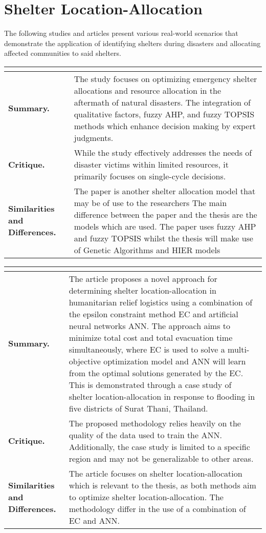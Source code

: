 \section{Shelter Location-Allocation}

The following studies and articles present various real-world scenarios that demonstrate the application of identifying shelters during disasters and allocating affected communities to said shelters.

\begin{longtable}{|L{.2\linewidth}|L{.74\linewidth}|}
	\hline
	\\ \hline
	\textbf{Summary.} & The study focuses on optimizing emergency shelter allocations and resource allocation in the aftermath of natural disasters. The integration of qualitative factors, fuzzy AHP, and fuzzy TOPSIS methods which enhance decision making by expert judgments.\\ \hline
	\textbf{Critique.} & While the study effectively addresses the needs of disaster victims within limited resources, it primarily focuses on single-cycle decisions.\\ \hline
	\textbf{Similarities and Differences.} & The paper is another shelter allocation model that may be of use to the researchers	The main difference between the paper and the thesis are the models which are used. The paper uses fuzzy AHP and fuzzy TOPSIS whilst the thesis will make use of Genetic Algorithms and HIER models \\ \hline
\end{longtable}

\begin{longtable}{|L{.2\linewidth}|L{.74\linewidth}|}
	\hline
	\\ \hline
	\textbf{Summary.} & The article proposes a novel approach for determining shelter location-allocation in humanitarian relief logistics using a combination of the epsilon constraint method EC and artificial neural networks ANN. The approach aims to minimize total cost and total evacuation time simultaneously, where EC is used  to solve a multi-objective optimization model and ANN will learn from the optimal solutions generated by the EC. This is demonstrated through a case study of shelter location-allocation in response to flooding in five districts of Surat Thani, Thailand.\\ \hline
	\textbf{Critique.} & The proposed methodology relies heavily on the quality of the data used to train the ANN. Additionally, the case study is limited to a specific region and may not be generalizable to other areas.\\ \hline
	\textbf{Similarities and Differences.} & The article focuses on shelter location-allocation which is relevant to the thesis, as both methods aim to optimize shelter location-allocation.	The methodology differ in the use of a combination of EC and ANN. \\ \hline
\end{longtable}

